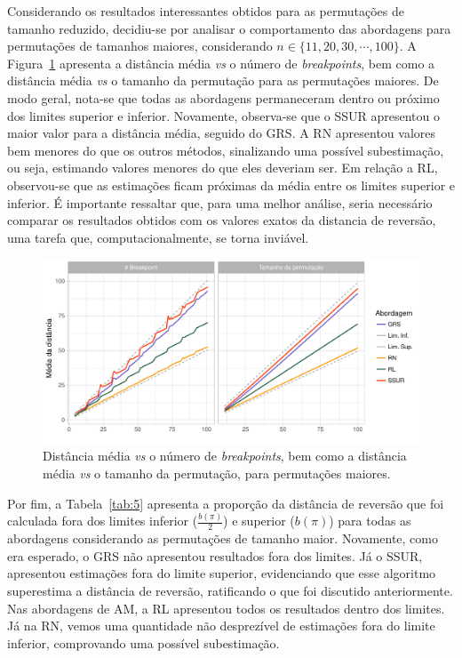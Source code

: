 \documentclass[runningheads,a4paper]{llncs}
\begin{document}
Considerando os resultados interessantes obtidos para as permutações de tamanho reduzido, decidiu-se por analisar o comportamento das abordagens para permutações de tamanhos maiores, considerando $n\in\{11,20,30,\cdots,100\}$.
A Figura~\ref{fig:big} apresenta a distância média \textit{vs} o número de \textit{breakpoints}, bem como a distância média \textit{vs} o tamanho da permutação para as permutações maiores. De modo geral, nota-se que todas as abordagens permaneceram dentro ou próximo dos limites superior e inferior. Novamente, observa-se que o SSUR apresentou o maior valor para a distância média, seguido do GRS. A RN apresentou valores bem menores do que os outros métodos, sinalizando uma possível subestimação, ou seja, estimando valores menores do que eles deveriam ser. Em relação a RL, observou-se que as estimações ficam próximas da média entre os limites superior e inferior. É importante ressaltar que, para uma melhor análise, seria necessário comparar os resultados obtidos com os valores exatos da distancia de reversão, uma tarefa que, computacionalmente, se torna inviável.

\begin{figure}[H]
	\centering
	\includegraphics[scale=0.5]{big.pdf}
	\caption{Distância média \textit{vs} o número de \textit{breakpoints}, bem como a distância média \textit{vs} o tamanho da permutação, para permutações maiores.}
	\label{fig:big}
\end{figure}

 Por fim, a Tabela~\ref{tab:5} apresenta a proporção da distância de reversão que foi calculada fora dos limites inferior ($\frac{b(\pi)}{2}$) e superior ($b(\pi)$) para todas as abordagens considerando as permutações de tamanho maior. Novamente, como era esperado, o GRS não apresentou resultados fora dos limites. Já o SSUR, apresentou estimações fora do limite superior, evidenciando que esse algoritmo superestima a distância de reversão, ratificando o que foi discutido anteriormente. Nas abordagens de AM, a RL apresentou todos os resultados dentro dos limites. Já na RN, vemos uma quantidade não desprezível de estimações fora do limite inferior, comprovando uma possível subestimação.
\end{document}
